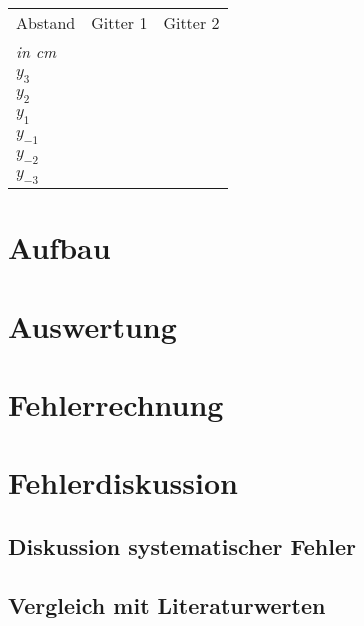 \documentclass[12pt,a4paper,titlepage,headinclude,bibtotoc]{scrartcl}
\begin{document}
\begin{table}
\centering
\begin{large}

\end{large}
\begin{tabular}{|p{4 cm}||p{4 cm}|p{4 cm}|}
        \hline
          Abstand  & Gitter 1  & Gitter 2 \\
          \textit{in cm} & & \\
         
         
         \hline 
         $y_3 $& & \\
         \hline
         $y_2 $& & \\
         \hline
         $y_{1} $& & \\
         
         \hline
         $y_{-1}$& & \\
         \hline
         $y_{-2}$& & \\
         \hline             
         $y_{-3}$& & \\
         \hline
\end{tabular}
\end{table}


\section{Aufbau}



\section{Auswertung}



\section{Fehlerrechnung}



\section{Fehlerdiskussion}
\subsection{Diskussion systematischer Fehler}



\subsection{Vergleich mit Literaturwerten}
\end{document}

